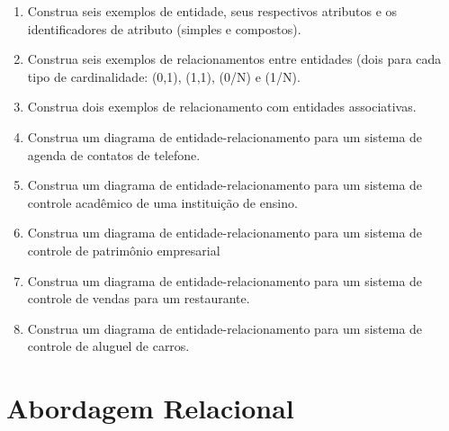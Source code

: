 \documentclass[11pt]{article}
\begin{document}
	\begin{enumerate}
		
		\item Construa seis exemplos de entidade, seus respectivos atributos e os identificadores de atributo (simples e compostos).
		
		\item Construa seis exemplos de relacionamentos entre entidades (dois para cada tipo de cardinalidade: (0,1), (1,1), (0/N) e (1/N).
				
		\item Construa dois exemplos de relacionamento com entidades associativas.
		
		\item Construa um diagrama de entidade-relacionamento para um sistema de agenda de contatos de telefone.
		
		\item Construa um diagrama de entidade-relacionamento para um sistema de controle acadêmico de uma
		instituição de ensino.
		
		\item Construa um diagrama de entidade-relacionamento para um sistema de controle de patrimônio empresarial
		
		\item Construa um diagrama de entidade-relacionamento para um sistema de controle de vendas para um restaurante.
		
		\item Construa um diagrama de entidade-relacionamento para um sistema de controle de aluguel de carros.
	\end{enumerate}
	
	\newpage
	
	\section{Abordagem Relacional}
	
\end{document}
